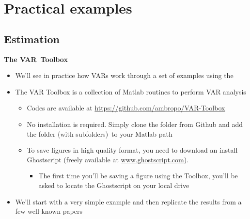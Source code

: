 
\section{Practical examples}

\begin{frame}
\vspace{3cm}\color{title} 
\end{frame}


\subsection{Estimation}

\begin{frame}
{\textbf{The VAR\ Toolbox}}\bigskip \medskip

\begin{itemize}
\item We'll see in practice how VARs work through a set of examples using
the {}%
\bigskip 
{}

\item The VAR Toolbox is a collection of Matlab routines to perform VAR
analysis\smallskip

\begin{itemize}
\item Codes are available at \url{https://github.com/ambropo/VAR-Toolbox}%
\medskip

\item No installation is required. Simply clone the folder from Github and
add the folder (with subfolders)\ to your Matlab path\medskip

\item To save figures in high quality format, you need to download an
install Ghostscript (freely available at \url{www.ghostscript.com}).

\begin{itemize}
\item The first time you'll be saving a figure using the Toolbox, you'll be
asked to locate the Ghostscript on your local drive\bigskip
\end{itemize}
\end{itemize}

\item We'll start with a very simple example and then replicate the results
from a few well-known papers
\end{itemize}
\end{frame}

